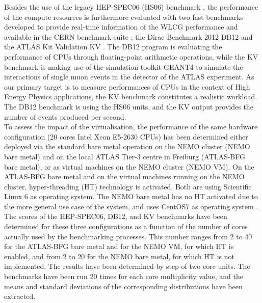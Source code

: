 Besides the use of the legacy HEP-SPEC06 (HS06) benchmark \cite{Hepspec}, the performance of the compute resources is furthermore evaluated with two fast benchmarks
developed to provide real-time information of the WLCG performance and available in the CERN benchmark suite \cite{Alef:2017jyx}; the Dirac Benchmark 2012 DB12 \cite{DB12}
and the ATLAS Kit Validation KV \cite{DeSalvo:2010zza}. The DB12 program is evaluating the performance of CPUs through floating-point arithmetic operations, while the KV benchmark
is making use of the simulation toolkit GEANT4 \cite{Agostinelli:2002hh} to simulate the interactions of single muon events in the detector of the ATLAS experiment. As our primary
target is to measure performances of CPUs in the context of High Energy Physics applications, the KV benchmark constitutes a realistic workload. The DB12 benchmark is using
the HS06 units, and the KV output provides the number of events produced per second. \\

To assess the impact of the virtualisation, the performance of the same hardware configuration (20 cores Intel Xeon E5-2630 CPUs) has been determined either deployed via
the standard bare metal operation on the NEMO cluster (NEMO bare metal) and on the local ATLAS Tier-3 centre in Freiburg (ATLAS-BFG bare metal), or as virtual machines on the
NEMO cluster (NEMO VM). On the ATLAS-BFG bare metal and on the virtual machines running on the NEMO cluster, hyper-threading (HT) technology is activated. Both are using Scientific
Linux 6 \cite{SL6} as operating system. The NEMO bare metal has no HT activated due to the more general use case of the system, and uses CentOS7 as operating system \cite{CentOS7}. %
The scores of the HEP-SPEC06, DB12, and KV benchmarks have been determined for these three configurations as a function of the number of cores actually used by the benchmarking processes.
This number ranges from 2 to 40 for the ATLAS-BFG bare metal and for the NEMO VM, for which HT is enabled, and from 2 to 20 for the NEMO bare metal,
for which HT is not implemented. The results have been determined by step of two core units. The benchmarks have been run 20 times for each core multiplicity value, and the means
and standard deviations of the corresponding distributions have been extracted. \\

